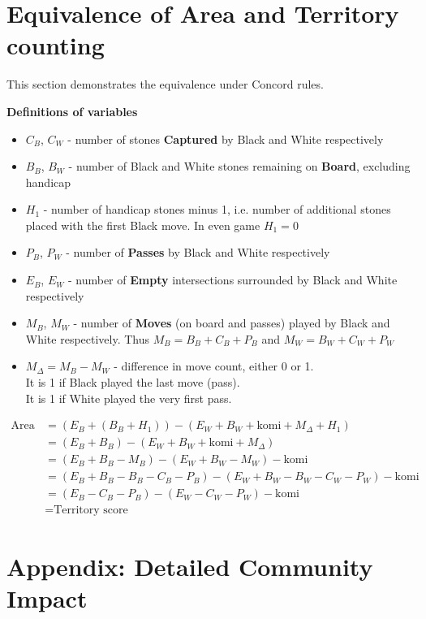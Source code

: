 \documentclass[11pt]{article}
\begin{document}
\newpage
\section{Equivalence of Area and Territory counting}

This section demonstrates the equivalence under Concord rules.

\textbf{Definitions of variables}

\begin{itemize}
\item $C_B$, $C_W$ - number of stones \textbf{Captured} by Black and White respectively
\item $B_B$, $B_W$ - number of Black and White stones remaining on \textbf{Board}, excluding handicap
\item $H_1$ - number of handicap stones minus 1, i.e. number of additional stones placed with the first Black move. In even game $H_1 = 0$
\item $P_B$, $P_W$ - number of \textbf{Passes} by Black and White respectively
\item $E_B$, $E_W$ - number of \textbf{Empty} intersections surrounded by Black and White respectively
\item $M_B$, $M_W$ - number of \textbf{Moves} (on board and passes) played by Black and White respectively. Thus $M_B = B_B + C_B + P_B$ and $M_W = B_W + C_W + P_W$
\item $M_\Delta = M_B - M_W$ - difference in move count, either 0 or 1. \\
It is 1 if Black played the last move (pass).\\
It is 1 if White played the very first pass.
\end{itemize}

\begin{align}
\text{Area score} &= (E_B + (B_B+H_1)) - (E_W + B_W + \text{komi} + M_\Delta + H_1) \\
&= (E_B + B_B) - (E_W + B_W + \text{komi} + M_\Delta) \\
&= (E_B + B_B - M_B) - (E_W + B_W - M_W) - \text{komi} \\
&= (E_B + B_B - B_B - C_B - P_B ) - (E_W + B_W - B_W - C_W - P_W) - \text{komi} \\
&= (E_B - C_B - P_B) - (E_W - C_W - P_W) - \text{komi} \\
&= \text{Territory score}
\end{align}

\newpage
\section*{Appendix: Detailed Community Impact}
\end{document}
